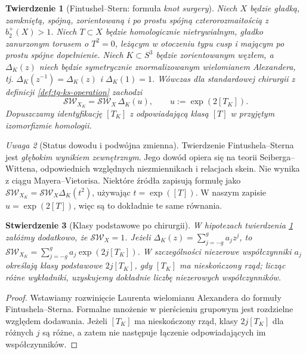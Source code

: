 \documentclass[11pt,a4paper]{report}
\numberwithin{equation}{section}
\theoremstyle{plain}
\newtheorem{twierdzenie}{Twierdzenie}[section]
\newtheorem{stwierdzenie}[twierdzenie]{Stwierdzenie}
\theoremstyle{definition}
\theoremstyle{remark}
\newtheorem{uwaga}[twierdzenie]{Uwaga}
\begin{document}
\begin{twierdzenie}[Fintushel--Stern: formuła \emph{knot surgery}]
\label{thm:tg-ks-formula}
Niech $X$ będzie gładką, zamkniętą, spójną,
zorientowaną i po prostu spójną czterorozmaitością
z $b_2^+(X)>1$. Niech $T\subset X$ będzie homologicznie
nietrywialnym, gładko zanurzonym torusem o $T^2=0$,
leżącym w otoczeniu typu \emph{cusp} i mającym
po prostu spójne dopełnienie. Niech
$K\subset S^3$ będzie zorientowanym węzłem,
a $\Delta_K(z)$ niech będzie symetrycznie
znormalizowanym wielomianem Alexandera, tj.
$\Delta_K(z^{-1})=\Delta_K(z)$ i $\Delta_K(1)=1$.
Wówczas dla standardowej chirurgii z definicji
\ref{def:tg-ks-operation} zachodzi
\[
\mathcal{SW}_{X_K}=\mathcal{SW}_X\,\Delta_K(u),
\qquad u:=\exp(2[T_K]).
\]
Dopuszczamy identyfikację $[T_K]$ z odpowiadającą
klasą $[T]$ w przyjętym izomorfizmie homologii.
\end{twierdzenie}

\begin{uwaga}[Status dowodu i podwójna zmienna]
Twierdzenie Fintushela--Sterna jest \emph{głębokim
wynikiem zewnętrznym}. Jego dowód opiera się na teorii
Seiberga--Wittena, odpowiednich względnych niezmiennikach
i relacjach skein. Nie wynika z ciągu Mayera--Vietorisa.
Niektóre źródła zapisują formułę jako
$\mathcal{SW}_{X_K}=\mathcal{SW}_X\Delta_K(t^2)$,
używając $t=\exp([T])$. W naszym zapisie
$u=\exp(2[T])$, więc są to dokładnie te same równania.
\end{uwaga}

\begin{stwierdzenie}[Klasy podstawowe po chirurgii]
\label{prop:tg-ks-basic}
W hipotezach twierdzenia \ref{thm:tg-ks-formula}
załóżmy dodatkowo, że $\mathcal{SW}_X=1$.
Jeżeli $\Delta_K(z)=\sum_{j=-g}^{g}a_jz^j$,
to $\mathcal{SW}_{X_K}=\sum_{j=-g}^{g}a_j\exp(2j[T_K])$.
W szczególności niezerowe współczynniki $a_j$
określają klasy podstawowe $2j[T_K]$, gdy
$[T_K]$ ma nieskończony rząd; licząc różne wykładniki,
uzyskujemy dokładnie liczbę niezerowych współczynników.
\end{stwierdzenie}

\begin{proof}
Wstawiamy rozwinięcie Laurenta wielomianu Alexandera
do formuły Fintushela--Sterna. Formalne mnożenie
w pierścieniu grupowym jest rozdzielne względem dodawania.
Jeżeli $[T_K]$ ma nieskończony rząd, klasy $2j[T_K]$
dla różnych $j$ są różne, a zatem nie następuje
łączenie odpowiadających im współczynników.
\end{proof}
\end{document}
